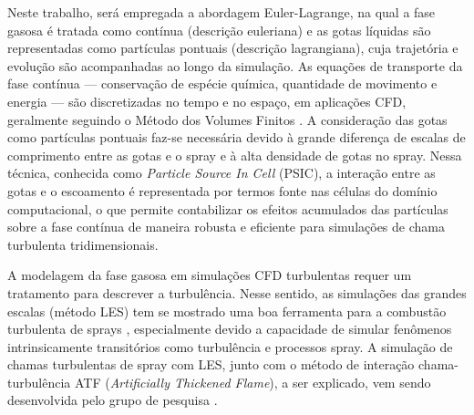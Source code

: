 

Neste trabalho, será empregada a abordagem Euler-Lagrange, na qual a fase gasosa é tratada como contínua (descrição euleriana) e as gotas líquidas são representadas como partículas pontuais (descrição lagrangiana), cuja trajetória e evolução são acompanhadas ao longo da simulação. 
As equações de transporte da fase contínua — conservação de espécie química, quantidade de movimento e energia — são discretizadas no tempo e no espaço, em aplicações CFD, geralmente seguindo o Método dos Volumes Finitos \cite{Anderson2009}.
A consideração das gotas como partículas pontuais faz-se necessária devido à grande diferença de escalas de comprimento entre as gotas e o spray e à alta densidade de gotas no spray.
Nessa técnica, conhecida como \emph{Particle Source In Cell} (PSIC), a interação entre as gotas e o escoamento é representada por termos fonte nas células do domínio computacional, o que permite contabilizar os efeitos acumulados das partículas sobre a fase contínua de maneira robusta e eficiente para simulações de chama turbulenta tridimensionais.

A modelagem da fase gasosa em simulações CFD turbulentas requer um tratamento para descrever a turbulência. 
Nesse sentido, as simulações das grandes escalas (método LES) tem se mostrado uma boa ferramenta para a combustão turbulenta de sprays \cite{SacomanoF2020CF}, especialmente devido a capacidade de simular fenômenos intrinsicamente transitórios como turbulência e processos spray.
A simulação de chamas turbulentas de spray com LES, junto com o método de interação chama-turbulência ATF (\emph{Artificially Thickened Flame}), a ser explicado, vem sendo desenvolvida pelo grupo de pesquisa \cite{SacomanoF2017PhD,SacomanoF2019Fluids,SacomanoF2017CF,SacomanoF2020CF,SacomanoF2018CTM}.

